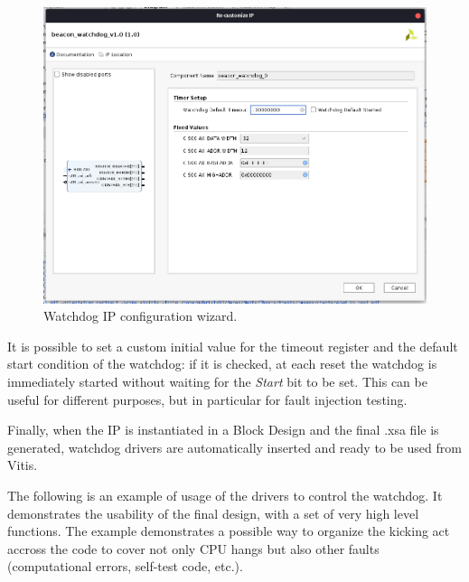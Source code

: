 \begin{figure}[H]
\centering
\includegraphics[width=0.8\linewidth]{images/chapter4/wizard_ip.png}
\caption{Watchdog IP configuration wizard.}
\label{fig:wd_ip_wizard}
\end{figure}

It is possible to set a custom initial value for the timeout register and the default start condition of the watchdog: if it is checked, at each reset the watchdog is immediately started without waiting for the \textit{Start} bit to be set. This can be useful for different purposes, but in particular for fault injection testing.\bigskip

Finally, when the IP is instantiated in a Block Design and the final .xsa file is generated, watchdog drivers are automatically inserted and ready to be used from Vitis.\bigskip

The following is an example of usage of the drivers to control the watchdog. It demonstrates the usability of the final design, with a set of very high level functions. The example demonstrates a possible way to organize the kicking act accross the code to cover not only CPU hangs but also other faults (computational errors, self-test code, etc.).

